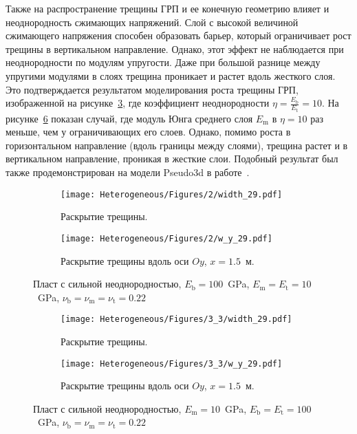 Также на распространение трещины ГРП и ее конечную геометрию влияет и неоднородность сжимающих напряжений. Слой с высокой величиной сжимающего напряжения способен образовать барьер, который ограничивает рост трещины в вертикальном направление. Однако, этот эффект не наблюдается при неоднородности по модулям упругости. Даже при большой разнице между упругими модулями в слоях трещина проникает и растет вдоль жесткого слоя. Это подтверждается результатом моделирования роста трещины ГРП, изображенной на рисунке~\ref{fig:heterogeneous-high}, где коэффициент неоднородности $\eta=\frac{E_\text{b}}{E_\text{t}} = 10$. На рисунке~\ref{fig:heterogeneous-3layer} показан случай, где модуль Юнга среднего слоя $E_\text{m}$ в $\eta=10$ раз меньше, чем у ограничивающих его слоев. Однако, помимо роста в горизонтальном направление (вдоль границы между слоями), трещина растет и в вертикальном направление, проникая в жесткие слои. Подобный результат был также продемонстрирован на модели Pseudo3d в работе~\cite{gu2006}.
\begin{figure}[htbp]
    \centering
    \begin{subfigure}[t]{0.4\textwidth}
        \centering
        \texttt{[image: Heterogeneous/Figures/2/width\_29.pdf]}
        \caption{Раскрытие трещины.}
        \label{fig:heterogeneous-high-planar}
    \end{subfigure}
    \hfill 
    \begin{subfigure}[t]{0.55\textwidth}
        \centering
        \texttt{[image: Heterogeneous/Figures/2/w\_y\_29.pdf]}
        \caption{Раскрытие трещины вдоль оси $Oy$, $x=1.5$~м.}
        \label{fig:heterogeneous-high-slice}
    \end{subfigure}
    \caption{Пласт с сильной неоднородностью, $E_\text{b} = 100$~GPa, $E_\text{m} = E_\text{t} = 10$~GPa, $\nu_\text{b} = \nu_\text{m} = \nu_\text{t} = 0.22$}
    \label{fig:heterogeneous-high}
\end{figure}


\begin{figure}[htbp]
    \centering
    \begin{subfigure}[t]{0.4\textwidth}
        \centering
        \texttt{[image: Heterogeneous/Figures/3\_3/width\_29.pdf]}
        \caption{Раскрытие трещины.}
        \label{fig:heterogeneous-3layer-planar}
    \end{subfigure}
    \hfill 
    \begin{subfigure}[t]{0.55\textwidth}
        \centering
        \texttt{[image: Heterogeneous/Figures/3\_3/w\_y\_29.pdf]}
        \caption{Раскрытие трещины вдоль оси $Oy$, $x=1.5$~м.}
        \label{fig:heterogeneous-3layer-slice}
    \end{subfigure}
    \caption{Пласт с сильной неоднородностью, $E_\text{m} = 10$~GPa, $E_\text{b} = E_\text{t} = 100$~GPa, $\nu_\text{b} = \nu_\text{m} = \nu_\text{t} = 0.22$}
    \label{fig:heterogeneous-3layer}
\end{figure}


